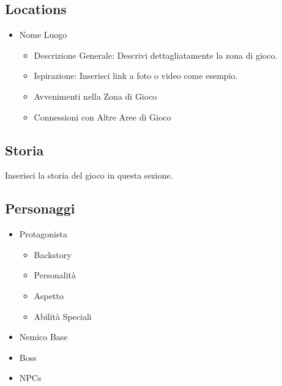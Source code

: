 \documentclass{report}
\begin{document}
\subsection{Locations}
\begin{itemize}
\item Nome Luogo
      \begin{itemize}
        \item Descrizione Generale: Descrivi dettagliatamente la zona di gioco.
        \item Ispirazione: Inserisci link a foto o video come esempio.
        \item Avvenimenti nella Zona di Gioco
        \item Connessioni con Altre Aree di Gioco
      \end{itemize}
\end{itemize}

\subsection{Storia}
Inserisci la storia del gioco in questa sezione.

\subsection{Personaggi}
\begin{itemize}
    \item Protagonista
        \begin{itemize}
            \item Backstory
            \item Personalità
            \item Aspetto
            \item Abilità Speciali
        \end{itemize}
    \item Nemico Base
    \item Boss
    \item NPCs
\end{itemize}
\end{document}
